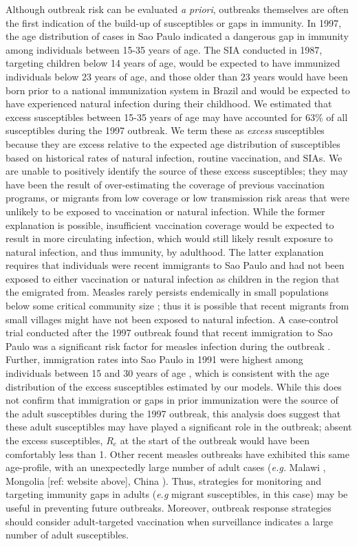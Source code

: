 Although outbreak risk can be evaluated \emph{a priori}, outbreaks themselves are often the first indication of the build-up of susceptibles or gaps in immunity. In 1997, the age distribution of cases in Sao Paulo indicated a dangerous gap in immunity among individuals between 15-35 years of age. The SIA conducted in 1987, targeting children below 14 years of age, would be expected to have immunized individuals below 23 years of age, and those older than 23 years would have been born prior to a national immunization system in Brazil and would be expected
to have experienced natural infection during their childhood. We estimated that excess susceptibles between 15-35 years of age may have accounted for 63\% of all susceptibles during the 1997 outbreak. We term these as \emph{excess} susceptibles because they are excess relative to the expected age distribution of susceptibles based on historical rates of natural infection, routine vaccination, and SIAs. We are unable to positively identify the source of these excess susceptibles; they may have been the result of over-estimating the coverage of previous vaccination programs, or migrants from low coverage or low transmission risk areas that were unlikely to be exposed to vaccination or natural infection. While the former explanation is possible, insufficient vaccination coverage would be expected to result in more circulating infection, which would still likely result exposure to natural infection, and thus immunity, by adulthood. The latter explanation requires that individuals were recent immigrants to Sao Paulo and had not been exposed to either vaccination or natural infection as children in the region that the emigrated from. Measles rarely persists endemically in small populations below some critical community size \cite{Conlan_2007, Keeling_1997}; thus it is possible that recent migrants from small villages might have not been exposed to natural infection.  A case-control trial conducted after the 1997 outbreak found that recent immigration to Sao Paulo was a significant risk factor for measles infection during the outbreak \citet{Camargo_2000} . Further, immigration rates into Sao Paulo in 1991 were highest among individuals between 15 and 30 years of age \cite{de_Moraes_2016}, which is consistent with the age distribution of the excess susceptibles estimated by our models. While this does not confirm that immigration or gaps in prior immunization were the source of the adult susceptibles during the 1997 outbreak, this analysis does suggest that these adult susceptibles may have played a significant role in the outbreak; absent the excess susceptibles, $R_e$ at the start of the outbreak would have been comfortably less than 1. Other recent measles outbreaks have exhibited this same age-profile, with an unexpectedly large number of adult cases (\emph{e.g.} Malawi \cite{Minetti_2013}, Mongolia [ref: website above], China \cite{Zheng_2015}). Thus, strategies for monitoring and targeting immunity gaps in adults (\emph{e.g} migrant susceptibles, in this case) may be useful in preventing future outbreaks. Moreover, outbreak response strategies should consider adult-targeted vaccination when surveillance indicates a large number of adult susceptibles.


